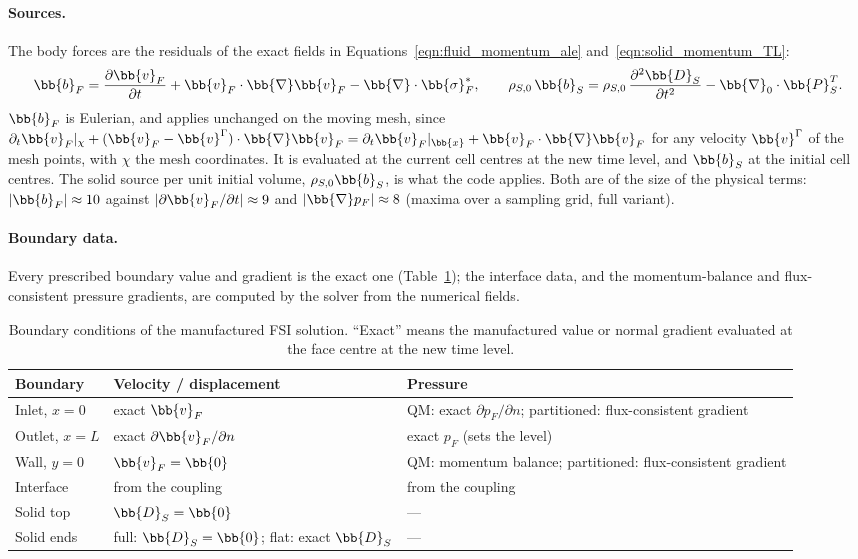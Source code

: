 \paragraph{Sources.}
The body forces are the residuals of the exact fields in Equations~\eqref{eqn:fluid_momentum_ale} and~\eqref{eqn:solid_momentum_TL}:
\begin{equation}
  \bb{b}_F = \frac{\partial\bb{v}_F}{\partial t} + \bb{v}_F\cdot\bb{\nabla}\bb{v}_F - \bb{\nabla}\cdot\bb{\sigma}_F^*, \qquad
  \rho_{S,0}\,\bb{b}_S = \rho_{S,0}\,\frac{\partial^2\bb{D}_S}{\partial t^2} - \bb{\nabla}_0\cdot\bb{P}_S^T .
  \label{eq:mmsc_sources}
\end{equation}
$\bb{b}_F$ is Eulerian, and applies unchanged on the moving mesh, since $\partial_t\bb{v}_F|_{\chi} + (\bb{v}_F - \bb{v}^\Gamma)\cdot\bb{\nabla}\bb{v}_F = \partial_t\bb{v}_F|_{\bb{x}} + \bb{v}_F\cdot\bb{\nabla}\bb{v}_F$ for any velocity $\bb{v}^\Gamma$ of the mesh points, with $\chi$ the mesh coordinates.
It is evaluated at the current cell centres at the new time level, and $\bb{b}_S$ at the initial cell centres.
The solid source per unit initial volume, $\rho_{S,0}\bb{b}_S$, is what the code applies.
Both are of the size of the physical terms: $|\bb{b}_F| \approx 10$ against $|\partial\bb{v}_F/\partial t| \approx 9$ and $|\bb{\nabla}p_F| \approx 8$ (maxima over a sampling grid, full variant).

\paragraph{Boundary data.}
Every prescribed boundary value and gradient is the exact one (Table~\ref{tab:mmsc_bc}); the interface data, and the momentum-balance and flux-consistent pressure gradients, are computed by the solver from the numerical fields.

\begin{table}[htbp]
  \centering
  \small
  \caption{Boundary conditions of the manufactured FSI solution. ``Exact'' means the manufactured value or normal gradient evaluated at the face centre at the new time level.}
  \label{tab:mmsc_bc}
  \begin{tabular}{lll}
    \toprule
    Boundary & Velocity / displacement & Pressure \\
    \midrule
    Inlet, $x = 0$ & exact $\bb{v}_F$ & QM: exact $\partial p_F/\partial n$; partitioned: flux-consistent gradient \\
    Outlet, $x = L$ & exact $\partial\bb{v}_F/\partial n$ & exact $p_F$ (sets the level) \\
    Wall, $y = 0$ & $\bb{v}_F = \bb{0}$ & QM: momentum balance; partitioned: flux-consistent gradient \\
    Interface & from the coupling & from the coupling \\
    Solid top & $\bb{D}_S = \bb{0}$ & --- \\
    Solid ends & full: $\bb{D}_S = \bb{0}$; flat: exact $\bb{D}_S$ & --- \\
    \bottomrule
  \end{tabular}
\end{table}


